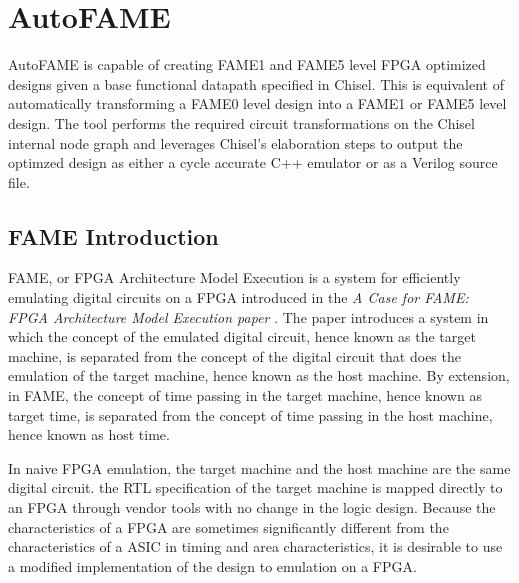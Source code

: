 \section{AutoFAME}
AutoFAME is capable of creating FAME1 and FAME5 level FPGA optimized designs given a base functional datapath specified in Chisel. This is equivalent of automatically transforming a FAME0 level design into a FAME1 or FAME5 level design. The tool performs the required circuit transformations on the Chisel internal node graph and leverages Chisel's elaboration steps to output the optimzed design as either a cycle accurate C++ emulator or as a Verilog source file. 

\subsection{FAME Introduction}
FAME, or FPGA Architecture Model Execution is a system for efficiently emulating digital circuits on a FPGA introduced in the \textit{A Case for FAME: FPGA Architecture Model Execution paper} \cite{FAME:2010}. The paper introduces a system in which the concept of the emulated digital circuit, hence known as the target machine, is separated from the concept of the digital circuit that does the emulation of the target machine, hence known as the host machine. By extension, in FAME, the concept of time passing in the target machine, hence known as target time, is separated from the concept of time passing in the host machine, hence known as host time. 

In naive FPGA emulation, the target machine and the host machine are the same digital circuit. the RTL specification of the target machine is mapped directly to an FPGA through vendor tools with no change in the logic design. Because the characteristics of a FPGA are sometimes significantly different from the characteristics of a ASIC in timing and area characteristics, it is desirable to use a modified implementation of the design to emulation on a FPGA.

